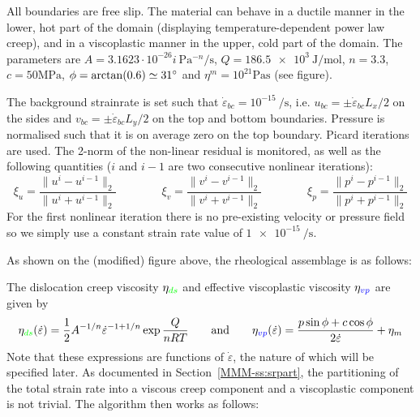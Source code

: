 All boundaries are free slip. The material can behave in a ductile manner in the lower, hot
part of the domain (displaying temperature-dependent power law creep), and in a viscoplastic 
manner in the upper, cold part of the domain. The parameters are 
$A=3.1623\cdot 10^{-26}i~\si{\pascal^{-n}\per\second}$, 
$Q=\SI{186.5e3}{\joule\per\mole}$, 
$n=3.3$, $c=50\si{\mega\pascal}$, $\phi=\arctan(0.6)\simeq 31\degree$ and 
$\eta^{m}=10^{21}\si{\pascal\second}$ (see figure).

The background strainrate is set such that $\dot{\varepsilon}_{bc}=10^{-15}~\si{\per\second}$, i.e. 
$u_{bc}=\pm \dot{\varepsilon}_{bc} L_x/2$ on the sides and $v_{bc}=\pm \dot{\varepsilon}_{bc} L_y/2 $
on the top and bottom boundaries. Pressure is normalised such that it is on average zero on the top boundary. 
Picard iterations are used. The 2-norm of the non-linear residual 
is monitored, as well as the following quantities ($i$ and $i-1$ are two consecutive nonlinear iterations):
\[
\xi_u = \frac{\|u^i-u^{i-1}\|_2}{ \|u^i+u^{i-1}\|_2}
\qquad
\qquad
\xi_v = \frac{\|v^i-v^{i-1}\|_2}{ \|v^i+v^{i-1}\|_2}
\qquad
\qquad
\xi_p = \frac{\|p^i-p^{i-1}\|_2}{ \|p^i+p^{i-1}\|_2}
\] 
For the first nonlinear iteration there is no pre-existing velocity or pressure field so 
we simply use a constant strain rate value of $\SI{1e-15}{\per\second}$.


As shown on the (modified) figure above, the rheological assemblage is as follows:
\begin{center}

\end{center}
The dislocation creep viscosity $\eta_{\color{green}ds}$ and effective 
viscoplastic viscosity $\eta_{\color{blue}vp}$ are given by 
\[
\eta_{\color{green}ds}(\dot\varepsilon) 
= \frac{1}{2} A^{-1/n} \dot{\varepsilon}^{-1+1/n} \exp \frac{Q}{nRT}
\qquad
\text{and}
\qquad
\eta_{\color{blue}vp}(\dot\varepsilon) 
= \frac{p \sin \phi + c \cos \phi}{2 \dot{\varepsilon}}  + \eta_{m}
\]
Note that these expressions are functions of $\dot\varepsilon$, the nature of which will be specified later. 
As documented in Section~\ref{MMM-ss:srpart}, 
the partitioning of the total strain rate into a viscous creep component and a viscoplastic component 
is not trivial.  
The algorithm then works as follows:

